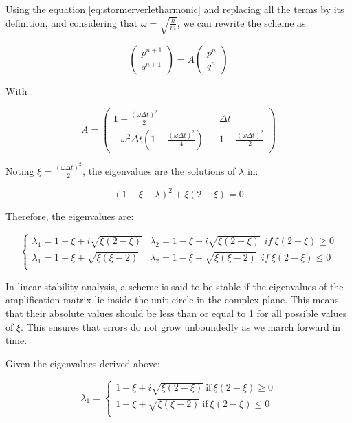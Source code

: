 \documentclass{article}
\begin{document}
Using the equation \ref{eq:stormerverletharmonic} and replacing all the terms by its definition, and considering that \(\omega = \sqrt{\frac{k}{m}}\), we can rewrite the scheme as:

\[
	\begin{pmatrix} p^{n+1} \\ q^{n+1} \end{pmatrix} = A \begin{pmatrix} p^{n} \\ q^{n} \end{pmatrix}
\]

With

\[
	A = \begin{pmatrix}
		1 - \frac{(\omega \Delta t)^2}{2} && \Delta t \\
		-\omega^2 \Delta t (1 - \frac{(\omega \Delta t)^2}{4}) && 1 - \frac{(\omega \Delta t)^2}{2}
	\end{pmatrix}
\]

Noting \(\xi = \frac{(\omega \Delta t)^2}{2}\), the eigenvalues are the solutions of $\lambda$ in:

\[
	(1 - \xi - \lambda)^2 + \xi (2 - \xi) = 0
\]

Therefore, the eigenvalues are:

\[
	\begin{cases}
		\lambda_1 = 1 - \xi + i\sqrt{\xi(2-\xi)} &
		\lambda_2 = 1 - \xi - i\sqrt{\xi(2-\xi)} \ \ if \ \xi(2-\xi) \geq 0 \\

		\lambda_1 = 1 - \xi + \sqrt{\xi(\xi - 2)} &
		\lambda_2 = 1 - \xi - \sqrt{\xi(\xi - 2)} \ \ if \ \xi(2-\xi) \leq 0 \\
	\end{cases}
\]

In linear stability analysis, a scheme is said to be stable if the eigenvalues of the amplification matrix lie inside the unit circle in the complex plane. This means that their absolute values should be less than or equal to 1 for all possible values of \( \xi \). This ensures that errors do not grow unboundedly as we march forward in time.

Given the eigenvalues derived above:

\[
	\lambda_1 = \begin{cases}
		1 - \xi + i\sqrt{\xi(2-\xi)} \ \text{if} \ \xi(2-\xi) \geq 0 \\
		1 - \xi + \sqrt{\xi(\xi - 2)} \ \text{if} \ \xi(2-\xi) \leq 0 \\
	\end{cases}
\]
\end{document}
